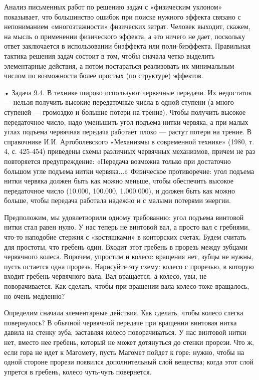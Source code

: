 Анализ  письменных  работ  по  решению задач  с  «физическим  уклоном»
показывает, что большинство ошибок  при поиске нужного эффекта связано
с  непониманием «многоэтажности»  физических затрат.  Человек выходит,
скажем, на  мысль о  применении физического эффекта,  а это  ничего не
дает,  поскольку  ответ  заключается  в  использовании  биэффекта  или
поли-биэффекта. Правильная тактика решения  задач состоит в том, чтобы
сначала  четко выделить  элементарные  действия,  а потом  постараться
реализовать  их минимальным  числом по  возможности более  простых (по
структуре) эффектов.

•  Задача 9.4.  В  технике широко  используют  червячные передачи.  Их
недостаток  —  нельзя  получить  высокие передаточные  числа  в  одной
ступени (а  много ступеней  — громоздко и  большие потери  на трение).
Чтобы получить высокое передаточное число, надо уменьшить угол подъема
нитки червяка, а  при малых углах подъема  червячная передача работает
плохо —  растут потери  на трение.  В справочнике  И.И. Артоболевского
«Механизмы в современной  технике» (1980, т. 4,  с. 425-454) приведены
схемы  различных  червячных  механизмов,  причем  не  раз  повторяется
предупреждение: «Передача возможна только  при достаточно большом угле
подъема нитки червяка...» Физическое  противоречие: угол подъема нитки
червяка  должен  быть  как  можно  меньше,  чтобы  обеспечить  высокое
передаточное  число (10.000,  100.000, 1.000.000),  и должен  быть как
можно  больше, чтобы  передача работала  надежно и  с малыми  потерями
энергии.

Предположим, мы удовлетворили одному требованию: угол подъема винтовой
нитки стал равен  нулю. У нас теперь  не винтовой вал, а  просто вал с
гребнями, что-то наподобие стержня с «костяшками» в конторских счетах.
Будем считать  для простоты, что  гребень один. Входит этот  гребень в
прорезь между  зубцами червячного колеса. Впрочем,  упростим и колесо:
вращения нет, зубцы  не нужны, пусть остается  одна прорезь. Нарисуйте
эту  схему: колесо  с прорезью,  в которую  входит гребень  червячного
вала. Вал  вращается, а колесо,  увы, не поворачивается.  Как сделать,
чтобы при вращении вала колесо тоже вращалось, но очень медленно?


Определим  сначала элементарные  действия. Как  сделать, чтобы  колесо
слегка повернулось? В обычной червячной передаче при вращении винтовая
нитка давила  на стенку зуба,  заставляя колесо поворачиваться.  У нас
винтовой нитки нет, вместо нее гребень, который не может дотянуться до
стенки прорези.  Что ж, если  гора не  идет к Магомету,  пусть Магомет
пойдет  к  горе:  нужно,  чтобы  на  одной  стороне  прорези  появился
дополнительный  слой  вещества; когда  этот  слой  упрется в  гребень,
колесо чуть-чуть повернется.

